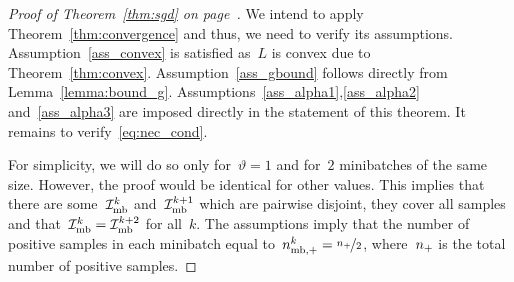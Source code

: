 \sgd*
\begin{proof}[Proof of Theorem~\ref{thm:sgd} on page~\pageref{thm:sgd}]
  We intend to apply Theorem~\ref{thm:convergence} and thus, we need to verify its assumptions. Assumption~\ref{ass_convex} is satisfied as~$L$ is convex due to Theorem~\ref{thm:convex}. Assumption~\ref{ass_gbound} follows directly from Lemma~\ref{lemma:bound_g}. Assumptions~\ref{ass_alpha1},\ref{ass_alpha2} and~\ref{ass_alpha3} are imposed directly in the statement of this theorem. It remains to verify~\eqref{eq:nec_cond}.

  For simplicity, we will do so only for~$\vartheta = 1$ and for~$2$ minibatches of the same size. However, the proof would be identical for other values. This implies that there are some~$\mathcal{I}_{\text{mb}}^k$ and~$\mathcal{I}_{\text{mb}}^{k+1}$ which are pairwise disjoint, they cover all samples and that~$\mathcal{I}_{\text{mb}}^k = \mathcal{I}_{\text{mb}}^{k+2}$ for all~$k$. The assumptions imply that the number of positive samples in each minibatch equal to~$n_{\text{mb},+}^k = \nicefrac{n_{+}}{2}$, where~$n_{+}$ is the total number of positive samples.


\end{proof}
